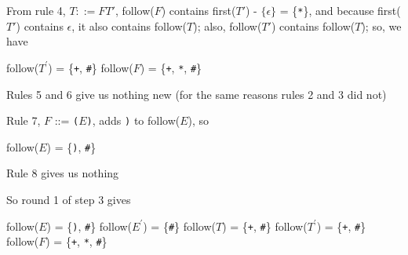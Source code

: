 \documentclass[8pt,a4paper,compress,handout]{beamer}
\newcommand{\mm}[1]{$#1$}
\newcommand{\expo}[2]{$#1^{#2}$}
\newenvironment{spaced}
{
\smallskip
\hspace{.5cm}
\begin{minipage}[c]{\textwidth}
}
{
\end{minipage}
\smallskip
}
\begin{document}
\begin{frame}[fragile]
\pause

From rule 4, $T  ::= F T'$, follow($F$) contains first($T'$) - $\{\epsilon\}$ = \{\lstinline{*}\}, and because first($T'$) contains $\epsilon$, it also contains follow($T$); also, follow($T'$) contains follow($T$); so, we have

\text{ }
\begin{spaced}
\begin{production}
follow(\expo{T}{\prime}) = \{\lstinline{+}, \lstinline{#}\}
follow(\mm{F})  = \{\lstinline{+}, \lstinline{*}, \lstinline{#}\}
\end{production}
\end{spaced}

\pause

Rules 5 and 6 give us nothing new (for the same reasons rules 2 and 3 did not)

\pause
\bigskip

Rule 7, $F$  ::= \lstinline{(}$E$\lstinline{)}, adds \lstinline{)} to follow($E$), so

\text{ }
\begin{spaced}
\begin{production}
follow(\mm{E}) = \{\lstinline{)}, \lstinline{#}\}
\end{production}
\end{spaced}

\pause

Rule 8 gives us nothing

\pause
\bigskip

So round 1 of step 3 gives

\text{ }
\begin{spaced}
\begin{production}
follow(\mm{E})  = \{\lstinline{)}, \lstinline{#}\}
follow(\expo{E}{\prime}) = \{\lstinline{#}\}
follow(\mm{T})  = \{\lstinline{+}, \lstinline{#}\}
follow(\expo{T}{\prime}) = \{\lstinline{+}, \lstinline{#}\}
follow(\mm{F})  = \{\lstinline{+}, \lstinline{*}, \lstinline{#}\}
\end{production}
\end{spaced}
\end{frame}
\end{document}
